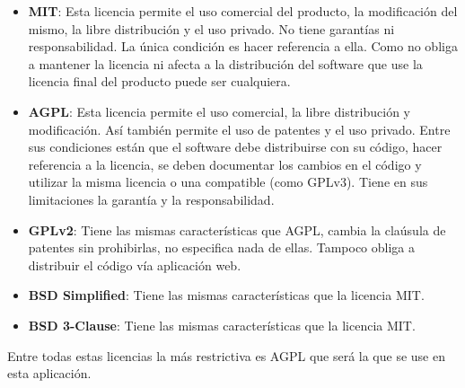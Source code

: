 \begin{itemize}
	\item \textbf{MIT}: Esta licencia permite el uso comercial del producto, la modificación del mismo, la libre distribución y el uso privado. No tiene garantías ni responsabilidad. La única condición es hacer referencia a ella. Como no obliga a mantener la licencia ni afecta a la distribución del software que use la licencia final del producto puede ser cualquiera.
	
	\item \textbf{AGPL}: Esta licencia permite el uso comercial, la libre distribución y modificación. Así también permite el uso de patentes y el uso privado. Entre sus condiciones están que el software debe distribuirse con su código, hacer referencia a la licencia, se deben documentar los cambios en el código y utilizar la misma licencia o una compatible (como GPLv3). Tiene en sus limitaciones la garantía y la responsabilidad.
	
	\item \textbf{GPLv2}: Tiene las mismas características que AGPL, cambia la claúsula de patentes sin prohibirlas, no especifica nada de ellas. Tampoco obliga a distribuir el código vía aplicación web.	
	
	\item \textbf{BSD Simplified}: Tiene las mismas características que la licencia MIT.
	
	\item \textbf{BSD 3-Clause}: Tiene las mismas características que la licencia MIT.
\end{itemize}

Entre todas estas licencias la más restrictiva es AGPL que será la que se use en esta aplicación.

